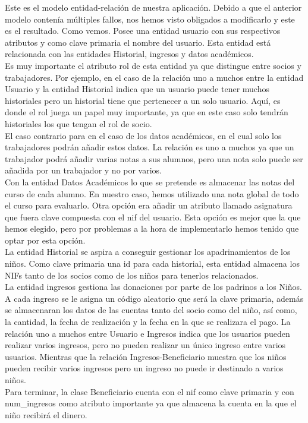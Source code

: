 \documentclass{article}
\begin{document}
Este es el modelo entidad-relación de nuestra aplicación. Debido a que el anterior modelo contenía múltiples fallos, nos hemos visto obligados a modificarlo y este es el resultado.
Como vemos. Posee una entidad usuario con sus respectivos atributos y como clave primaria el nombre del usuario. Esta entidad está relacionada con las entidades Historial, ingresos y datos académicos. \\
Es muy importante el atributo rol de esta entidad ya que distingue entre socios y trabajadores. Por ejemplo, en el caso de la relación uno a muchos entre la entidad Usuario y la entidad Historial indica que un usuario puede tener muchos historiales pero un historial tiene que pertenecer a un solo usuario. Aquí, es donde el rol juega un papel muy importante, ya que en este caso solo tendrán historiales los que tengan el rol de socio.\\
El caso contrario para en el caso de los datos académicos, en el cual solo los trabajadores podrán añadir estos datos. La relación es uno a muchos ya que un trabajador podrá añadir varias notas a sus alumnos, pero una nota solo puede ser añadida por un trabajador y no por varios.\\
Con la entidad Datos Académicos lo que se pretende es almacenar las notas del curso de cada alumno. En nuestro caso, hemos utilizado una nota global de todo el curso para evaluarlo. Otra opción era añadir un atributo llamado asignatura que fuera clave compuesta con el nif del usuario. Esta opción es mejor que la que hemos elegido, pero por problemas a la hora de implementarlo hemos tenido que optar por esta opción.\\
La entidad Historial se aspira a conseguir gestionar los apadrinamientos de los niños. Como clave primaria una id para cada historial, esta entidad almacena los NIFs tanto de los socios como de los niños para tenerlos relacionados.\\
La entidad ingresos gestiona las donaciones por parte de los padrinos a los Niños. A cada ingreso se le asigna un código aleatorio que será la clave primaria, además se almacenaran los datos de las cuentas tanto del socio como del niño, así como, la cantidad, la fecha de realización y la fecha en la que se realizara el pago. La relación uno a muchos entre Usuario e Ingresos indica que los usuarios pueden realizar varios ingresos, pero no pueden realizar un único ingreso entre varios usuarios. Mientras que la relación Ingresos-Beneficiario muestra que los niños pueden recibir varios ingresos pero un ingreso no puede ir destinado a varios niños.\\
Para terminar, la clase Beneficiario cuenta con el nif como clave primaria y con num\_ingresos como atributo importante ya que almacena la cuenta en la que el niño recibirá el dinero.
\end{document}
